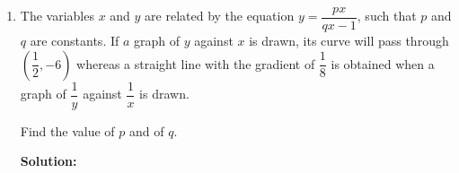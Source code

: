 \documentclass{report}
\newcommand{\sol}{\textbf{Solution:}}
\begin{document}
\begin{enumerate}[leftmargin=*]
          \sol{}
          \begin{align*}
              \overrightarrow{PQ} & = \overrightarrow{P O}+\overrightarrow{OQ} \\
                                  & = \overrightarrow{OQ}-\overrightarrow{OP}  \\
                                  & = q\vec{i}+2q\vec{j}-2\vec{i}-3\vec{j}     \\
                                  & = (q-2)\vec{i}+(2q-3)\vec{j}               \\
              \text{Magnitude}    & = \sqrt{(q-2)^2+(2q-3)^2}                  \\
                                  & = 1                                        \\
              (q-2)^2+(2q-3)^2    & = 1                                        \\
              q^2-4q+4+4q^2-12q+9 & = 1                                        \\
              5q^2-16q+13         & = 1                                        \\
              5q^2-16q+12         & = 0                                        \\
              (5q-6)(q-2)         & = 0                                        \\
              q                   & = \dfrac{6}{5}, 2
          \end{align*}

    \item The variables $x$ and $y$ are related by the equation $y=\dfrac{p x}{q x-1}$,
          such that $p$ and $q$ are constants. If $a$ graph of $y$ against $x$ is drawn,
          its curve will pass through $\left(\dfrac{1}{2},-6\right)$ whereas a straight
          line with the gradient of $\dfrac{1}{8}$ is obtained when a graph of
          $\dfrac{1}{y}$ against $\dfrac{1}{x}$ is drawn.

          Find the value of $p$ and of $q$.

          \sol{}


\end{enumerate}
\end{document}
